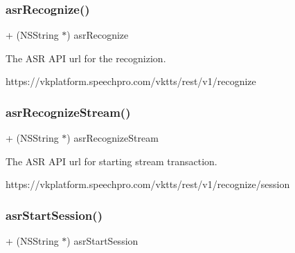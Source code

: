 \subsubsection{\texorpdfstring{asr\+Recognize()}{asrRecognize()}}
{\footnotesize\ttfamily + (N\+S\+String $\ast$) asr\+Recognize \begin{DoxyParamCaption}{ }\end{DoxyParamCaption}}

The A\+SR A\+PI url for the recognizion. 
\begin{DoxyCode}
https:\textcolor{comment}{//vkplatform.speechpro.com/vktts/rest/v1/recognize}
\end{DoxyCode}
 \hypertarget{interface_s_t_c_a_s_r_u_r_l_manager_a749459801c620146beef96a7a0903b94}{}\label{interface_s_t_c_a_s_r_u_r_l_manager_a749459801c620146beef96a7a0903b94} 
\subsubsection{\texorpdfstring{asr\+Recognize\+Stream()}{asrRecognizeStream()}}
{\footnotesize\ttfamily + (N\+S\+String $\ast$) asr\+Recognize\+Stream \begin{DoxyParamCaption}{ }\end{DoxyParamCaption}}

The A\+SR A\+PI url for starting stream transaction. 
\begin{DoxyCode}
https:\textcolor{comment}{//vkplatform.speechpro.com/vktts/rest/v1/recognize/session}
\end{DoxyCode}
 \hypertarget{interface_s_t_c_a_s_r_u_r_l_manager_ad7ab9c66ce37329efbf14c7ac96056d0}{}\label{interface_s_t_c_a_s_r_u_r_l_manager_ad7ab9c66ce37329efbf14c7ac96056d0} 
\subsubsection{\texorpdfstring{asr\+Start\+Session()}{asrStartSession()}}
{\footnotesize\ttfamily + (N\+S\+String $\ast$) asr\+Start\+Session \begin{DoxyParamCaption}{ }\end{DoxyParamCaption}}


